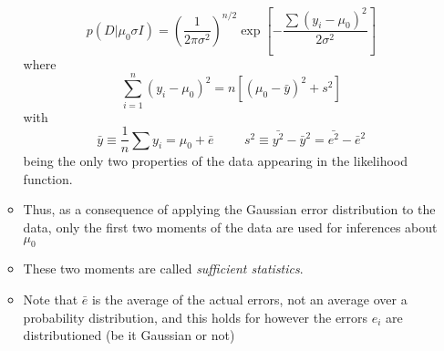 \documentclass[../jaynes_prob_theory_notes.tex]{subfiles}
\begin{document}
\begin{itemize}
\begin{itemize}
\begin{equation*}
                                    p(D|{\mu}_{0}{\sigma}I) = {\left( \frac{1}{2{\pi}{\sigma}^2} \right)}^{n/2} \exp \left[ -\frac{\sum {(y_i - {\mu}_0)}^2}{2{\sigma}^2} \right]
                                \end{equation*}
                                where 
                                \begin{equation*}
                                    \sum^{n}_{i=1} {(y_i - {\mu}_0)}^2 = n \left[{({\mu}_0 - \bar{y})}^2 + s^2 \right]
                                \end{equation*}
                                with 
                                \begin{equation*}
                                    \bar{y} \equiv \frac{1}{n} \sum y_i = {\mu}_0 + \bar{e} \hspace{1cm} s^2 \equiv \bar{y^2} - \bar{y}^2 = \bar{e^2} - \bar{e}^2
                                \end{equation*}
                                being the only two properties of the data appearing in the likelihood function.
                            \item Thus, as a consequence of applying the Gaussian error distribution to the data, only the first two moments of the data are used for inferences about ${\mu}_0$
                            \item These two moments are called \textit{sufficient statistics}.
                            \item Note that $\bar{e}$ is the average of the actual errors, not an average over a probability distribution, and this holds for however the errors $e_i$ are distributioned (be it Gaussian or not)
                        \end{itemize}
                \end{itemize}
            
\end{document}
